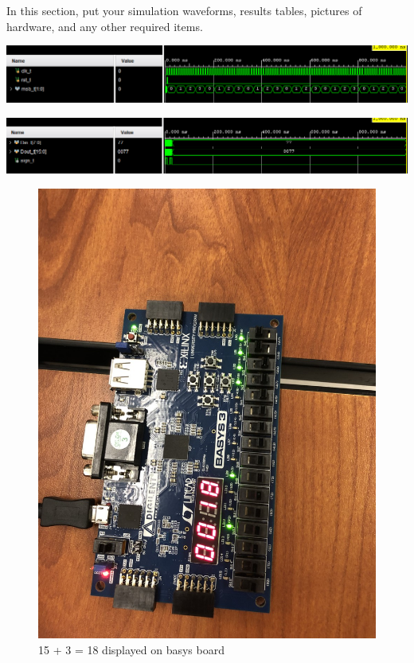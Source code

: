 \documentclass[11pt]{article}
\begin{document}
In this section, put your simulation waveforms, results tables, pictures of hardware, and any other required items.
\begin{center}
	\includegraphics[width=\textwidth]{test1}
\end{center}
\begin{center}
	\includegraphics[width=\textwidth]{show2ctest.png}
\end{center}
\begin{figure}
	\includegraphics[width=\textwidth]{posnum.png}
	\caption{15 + 3 = 18 displayed on basys board}
	\label{fig: ah}
\end{figure}
\end{document}
